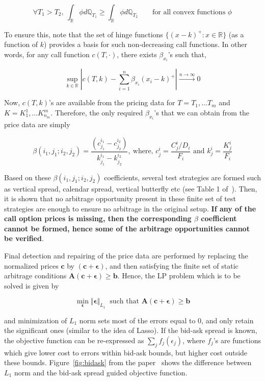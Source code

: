 \documentclass[12pt]{article}
\newcommand{\Q}{\mathbb{Q}}
\newcommand{\R}{\mathbb{R}}
\begin{document}
$$
\forall T_1 > T_2, \ \int_{\R} \phi d\Q_{T_1} \geq \int_{\R} \phi d\Q_{T_2} \qquad \text{for all convex functions } \phi
$$

\noindent To ensure this, note that the set of hinge functions $\{ (x - k)^+ : x \in \R \}$ (as a function of $k$) provides a basis for such non-decreasing call functions. In other words, for any call function $c(T, \cdot)$, there exists $\beta_{x_i}$'s such that, 

$$
\sup_{k \in \R} \left\vert c(T, k) - \sum_{i = 1}^{n} \beta_{x_i} (x_i - k)^+ \right\vert \xrightarrow{n \rightarrow \infty} 0
$$


\noindent Now, $c(T, k)$'s are available from the pricing data for $T = T_1, \dots T_m$ and $K = K_1^1, \dots K_{n_m}^m$. Therefore, the only required $\beta_{x_i}$'s that we can obtain from the price data are simply 

$$
\beta(i_1, j_1; i_2, j_2) = \dfrac{(c_{j_1}^{i_1} - c_{j_2}^{i_2})}{k_{j_1}^{i_1} - k_{j_2}^{i_2}}, \ \text{where, } c_{j}^i = \dfrac{C_j^i / D_i}{F_i} \text{ and } k_j^i = \dfrac{K_j^i}{F_i}
$$

\noindent Based on these $\beta(i_1, j_1; i_2, j_2)$ coefficients, several test strategies are formed such as vertical spread, calendar spread, vertical butterfly etc (see Table 1 of~\cite{cohen2020detecting}). Then, it is shown that no arbitrage opportunity present in these finite set of test strategies are enough to ensure no arbitrage in the original setup. \textbf{If any of the call option prices is missing, then the corresponding $\beta$ coefficient cannot be formed, hence some of the arbitrage opportunities cannot be verified}.

Final detection and repairing of the price data are performed by replacing the normalized prices $\boldsymbol{c}$ by $(\boldsymbol{c} + \boldsymbol{\epsilon})$, and then satisfying the finite set of static arbitrage conditions $\boldsymbol{A}(\boldsymbol{c} + \boldsymbol{\epsilon}) \geq \boldsymbol{b}$. Hence, the LP problem which is to be solved is given by 

$$
\min_{\boldsymbol{\epsilon}} \Vert \boldsymbol{\epsilon} \Vert_{L_1} \ \text{ such that } \boldsymbol{A}(\boldsymbol{c} + \boldsymbol{\epsilon}) \geq \boldsymbol{b}
$$

\noindent and minimization of $L_1$ norm sets most of the errors equal to $0$, and only retain the significant ones (similar to the idea of Lasso). If the bid-ask spread is known, the objective function can be re-expressed as $\sum_j f_j(\epsilon_j)$, where $f_j$'s are functions which give lower cost to errors within bid-ask bounds, but higher cost outside these bounds. Figure~\ref{fig:bidask} from the paper~\cite{cohen2020detecting} shows the difference between $L_1$ norm and the bid-ask spread guided objective function.
\end{document}
